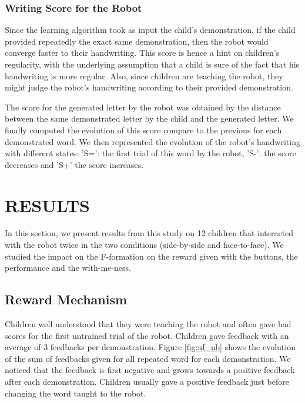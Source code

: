 \documentclass[letterpaper, 10 pt, conference]{ieeeconf}  %
\begin{document}
\subsubsection{Writing Score for the Robot}
Since the learning algorithm took as input the child's demonstration, if the child provided repeatedly the exact same demonstration, then the robot would converge faster to their handwriting.
This score is hence a hint on children's regularity, with the underlying assumption that a child is sure of the fact that his handwriting is more regular.
Also, since children are teaching the robot, they might judge the robot's handwriting according to their provided demonstration.

The score for the generated letter by the robot was obtained by the distance between the same demonstrated letter by the child and the generated letter.
We finally computed the evolution of this score compare to the previous for each demonstrated word.
We then represented the evolution of the robot's handwriting with different states:
'S=': the first trial of this word by the robot, 'S-': the score decreases and 'S+' the score increases. 


\section{RESULTS}
In this section, we present results from this study on 12 children that interacted with the robot twice in the two conditions (side-by-side and face-to-face).
We studied the impact on the F-formation on the reward given with the buttons, the performance and the with-me-ness.

\subsection{Reward Mechanism}
Children well understood that they were teaching the robot and often gave bad scores for the first untrained trial of the robot.
Children gave feedback with an average of 3 feedbacks per demonstration.
Figure \ref{fig:uf_nb} shows the evolution of the sum of feedbacks given for all repeated word for each demonstration.
We noticed that the feedback is first negative and grows towards a positive feedback after each demonstration.
Children usually gave a positive feedback just before changing the word taught to the robot.
\end{document}
